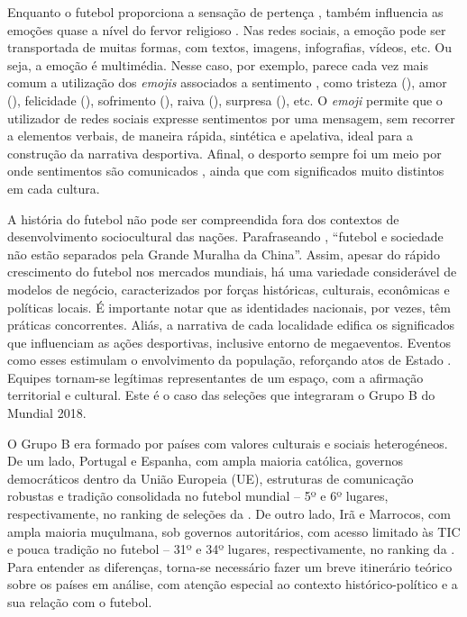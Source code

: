 \documentclass{textolivre}
\begin{document}
Enquanto o futebol proporciona a sensação de pertença \cite{pinheiro2002}, também influencia as emoções quase a nível do fervor religioso \cite{dorsey2016, gouveia2019}. Nas redes sociais, a emoção pode ser transportada de muitas formas, com textos, imagens, infografias, vídeos, etc. Ou seja, a emoção é multimédia. Nesse caso, por exemplo, parece cada vez mais comum a utilização dos \emph{emojis} associados a sentimento \cite{novak2015}, como tristeza ({}), amor ({}), felicidade ({}), sofrimento ({}), raiva ({}), surpresa ({}), etc. O \emph{emoji} permite que o utilizador de redes sociais expresse sentimentos por uma mensagem, sem recorrer a elementos verbais, de maneira rápida, sintética e apelativa, ideal para a construção da narrativa desportiva. Afinal, o desporto sempre foi um meio por onde sentimentos são comunicados \cite{wenner1989}, ainda que com significados muito distintos em cada cultura.

A história do futebol não pode ser compreendida fora dos contextos de desenvolvimento sociocultural das nações. Parafraseando \textcite[p. 658]{claussen2007}, “futebol e sociedade não estão separados pela Grande Muralha da China”. Assim, apesar do rápido crescimento do futebol nos mercados mundiais, há uma variedade considerável de modelos de negócio, caracterizados por forças históricas, culturais, econômicas e políticas locais. É importante notar que as identidades nacionais, por vezes, têm práticas concorrentes. Aliás, a narrativa de cada localidade edifica os significados que influenciam as ações desportivas, inclusive entorno de megaeventos. Eventos como esses estimulam o envolvimento da população, reforçando atos de Estado \cite{marivoet2006}. Equipes tornam-se legítimas representantes de um espaço, com a afirmação territorial e cultural. Este é o caso das seleções que integraram o Grupo B do Mundial 2018.

O Grupo B era formado por países com valores culturais e sociais heterogéneos. De um lado, Portugal e Espanha, com ampla maioria católica, governos democráticos dentro da União Europeia (UE), estruturas de comunicação robustas e tradição consolidada no futebol mundial – 5º e 6º lugares, respectivamente, no ranking de seleções da \textcite{fifa2021}. De outro lado, Irã e Marrocos, com ampla maioria muçulmana, sob governos autoritários, com acesso limitado às TIC e pouca tradição no futebol – 31º e 34º lugares, respectivamente, no ranking da \textcite{fifa2021}. Para entender as diferenças, torna-se necessário fazer um breve itinerário teórico sobre os países em análise, com atenção especial ao contexto histórico-político e a sua relação com o futebol.
\end{document}
